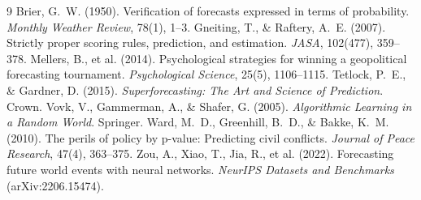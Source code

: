 \documentclass[11pt]{article}
\begin{document}
\begin{thebibliography}{9}\small
{} Brier, G.~W. (1950). Verification of
forecasts expressed in terms of probability. \emph{Monthly Weather Review},
78(1), 1--3.
 Gneiting, T., \&
Raftery, A.~E. (2007). Strictly proper scoring rules, prediction, and
estimation. \emph{JASA}, 102(477), 359--378.
 Mellers, B., et al. (2014).
Psychological strategies for winning a geopolitical forecasting tournament.
\emph{Psychological Science}, 25(5), 1106--1115.
 Tetlock, P.~E., \&
Gardner, D. (2015). \emph{Superforecasting: The Art and Science of
Prediction}. Crown.
 Vovk, V., Gammerman, A., \&
Shafer, G. (2005). \emph{Algorithmic Learning in a Random World}. Springer.
 Ward, M.~D., Greenhill, B.~D., \&
Bakke, K.~M. (2010). The perils of policy by p-value: Predicting civil
conflicts. \emph{Journal of Peace Research}, 47(4), 363--375.
 Zou, A., Xiao, T., Jia, R., et al.
(2022). Forecasting future world events with neural networks.
\emph{NeurIPS Datasets and Benchmarks} (arXiv:2206.15474).
\end{thebibliography}
\end{document}
